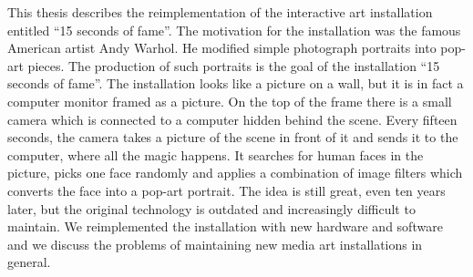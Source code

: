 This thesis describes the reimplementation of the interactive art installation
entitled ``15 seconds of fame''. The motivation for the installation was the
famous American artist Andy Warhol. He modified simple photograph portraits
into pop-art pieces. The production of such portraits is the goal of the
installation ``15 seconds of fame''. The installation looks like a picture on
a wall, but it is in fact a computer monitor framed as a picture. On the top
of the frame there is a small camera which is connected to a computer hidden
behind the scene. Every fifteen seconds, the camera takes a picture of the
scene in front of it and sends it to the computer, where all the magic happens. It
searches for human faces in the picture, picks one face randomly and applies a
combination of image filters which converts the face into a pop-art
portrait. The idea is still great, even ten years later, but the original
technology is outdated and increasingly difficult to maintain. We reimplemented
the installation with new hardware and software and we discuss the problems of
maintaining new media art installations in general.
